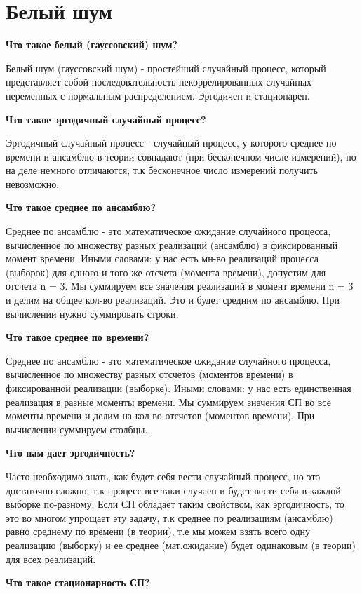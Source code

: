 \chapter{Белый шум}
\label{ch:chap2}

\textbf{Что такое белый (гауссовский) шум?}

Белый шум (гауссовский шум) - простейший случайный процесс, который представляет собой последовательность
некоррелированных случайных переменных с нормальным распределением. Эргодичен и стационарен.

\textbf{Что такое эргодичный случайный процесс?}

Эргодичный случайный процесс - случайный процесс, у которого среднее по времени и ансамблю в теории совпадают (при бесконечном числе измерений),
но на деле немного отличаются, т.к бесконечное число измерений получить невозможно.

\textbf{Что такое среднее по ансамблю?}

Среднее по ансамблю - это математическое ожидание случайного процесса, вычисленное по множеству разных реализаций (ансамблю) 
в фиксированный момент времени. Иными словами: у нас есть мн-во реализаций процесса (выборок) для одного и того же отсчета
(момента времени), допустим для отсчета n = 3. Мы суммируем все значения реализаций в момент времени n = 3 и делим на 
общее кол-во реализаций. Это и будет средним по ансамблю. При вычислении нужно суммировать строки.

\textbf{Что такое среднее по времени?}

Среднее по ансамблю - это математическое ожидание случайного процесса, вычисленное по множеству разных отсчетов (моментов времени) 
в фиксированной реализации (выборке). Иными словами: у нас есть единственная реализация в разные моменты времени. Мы суммируем
значения СП во все моменты времени и делим на кол-во отсчетов (моментов времени). При вычислении суммируем столбцы.

\textbf{Что нам дает эргодичность?}

Часто необходимо знать, как будет себя вести случайный процесс, но это достаточно сложно, т.к процесс все-таки случаен и будет
вести себя в каждой выборке по-разному. Если СП обладает таким свойством, как эргодичность, то это во многом упрощает эту задачу,
т.к среднее по реализациям (ансамблю) равно среднему по времени (в теории), т.е мы можем взять всего одну реализацию (выборку) и 
ее среднее (мат.ожидание) будет одинаковым (в теории) для всех реализаций. 

\textbf{Что такое стационарность СП?}

